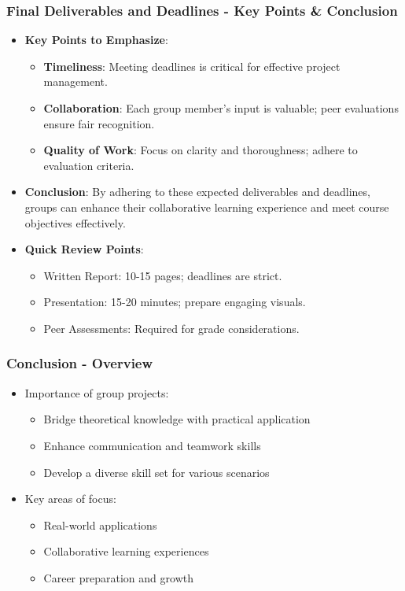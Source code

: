 \documentclass[aspectratio=169]{beamer}
\begin{document}
\begin{frame}[fragile]
    \frametitle{Final Deliverables and Deadlines - Key Points & Conclusion}
    \begin{itemize}
        \item \textbf{Key Points to Emphasize}:
        \begin{itemize}
            \item \textbf{Timeliness}: Meeting deadlines is critical for effective project management.
            \item \textbf{Collaboration}: Each group member’s input is valuable; peer evaluations ensure fair recognition.
            \item \textbf{Quality of Work}: Focus on clarity and thoroughness; adhere to evaluation criteria.
        \end{itemize}
        
        \item \textbf{Conclusion}: 
        By adhering to these expected deliverables and deadlines, groups can enhance their collaborative learning experience and meet course objectives effectively.
        
        \item \textbf{Quick Review Points}:
        \begin{itemize}
            \item Written Report: 10-15 pages; deadlines are strict.
            \item Presentation: 15-20 minutes; prepare engaging visuals.
            \item Peer Assessments: Required for grade considerations.
        \end{itemize}
    \end{itemize}
\end{frame}

\begin{frame}[fragile]
    \frametitle{Conclusion - Overview}
    \begin{itemize}
        \item Importance of group projects:
        \begin{itemize}
            \item Bridge theoretical knowledge with practical application
            \item Enhance communication and teamwork skills
            \item Develop a diverse skill set for various scenarios
        \end{itemize}
        \item Key areas of focus:
        \begin{itemize}
            \item Real-world applications
            \item Collaborative learning experiences
            \item Career preparation and growth
        \end{itemize}
    \end{itemize}
\end{frame}
\end{document}
